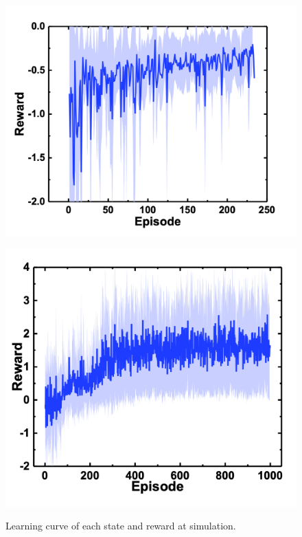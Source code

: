 \begin{figure}
\begin{minipage}[t]{0.45\linewidth}
        \includegraphics[width=1.1\linewidth]{figure/chapter3/QL_rew=distance_obs=posvec_origin}
        \label{fig:報酬距離}
    \end{minipage}
    \begin{minipage}[t]{0.5\linewidth}
        \centering
        \includegraphics[width=0.95\linewidth]{figure/chapter3/QL_rew=redArea_obs=posvec_origin}
        \label{fig:報酬面積}
    \end{minipage}
    \caption{Learning curve of each state and reward at simulation.}
    \label{fig:シミュレーション結果}
\end{figure}


